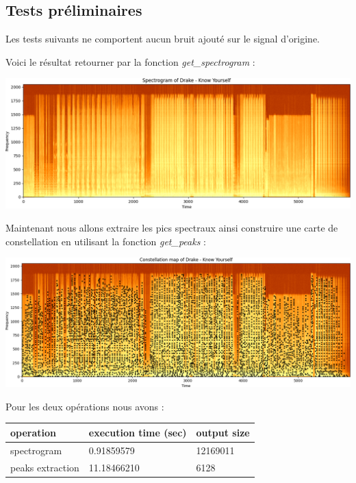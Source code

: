 \documentclass[11pt, report, french]{scrreprt}
\begin{document}
\newpage
\subsection{Tests préliminaires}
Les tests suivants ne comportent aucun bruit ajouté sur le signal d'origine. \\\par
Voici le résultat retourner par la fonction \textit{get\_spectrogram} :\\

\begin{center}
	\includegraphics[scale=0.535]{img/spectrogram_drake.png}
\end{center}

Maintenant nous allons extraire les pics spectraux ainsi construire une carte de constellation en utilisant la fonction \textit{get\_peaks} : \\

\begin{center}
	\includegraphics[scale=0.5]{img/constallation_drake.png}
\end{center}

Pour les deux opérations nous avons :

\begin{center}
	\begin{tabular}{ | m{3cm} || m{4cm}| m{4cm} | } 
		\hline
		operation & execution time (sec) & output size \\ 
		\hline
		\hline
		spectrogram & 0.91859579 & 12169011 \\ 
		\hline
		peaks extraction & 11.18466210 & 6128 \\ 
		\hline
	\end{tabular}
\end{center}
\end{document}
